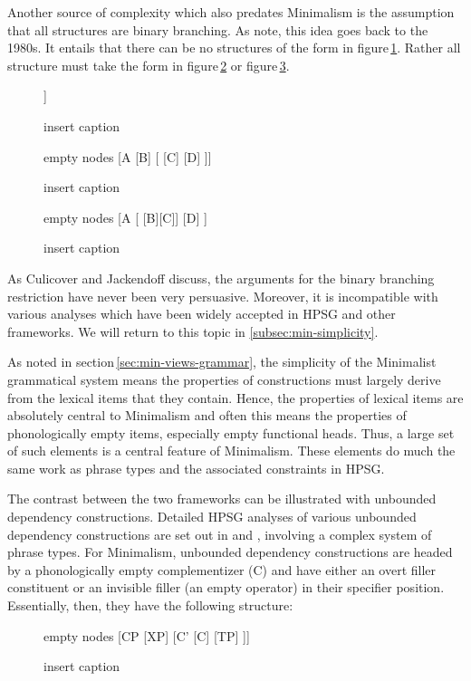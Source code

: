 \documentclass[output=paper]{langsci/langscibook}
\begin{document}
Another source of complexity which also predates Minimalism is the assumption that all structures are binary branching. As  \citet[112--116]{CJ2005a} note, this idea goes back to the 1980s. It entails that there can be no structures of the form in figure\,\ref{fig:min-trinary}. Rather all structure must take the form in figure\,\ref{fig:min-binary-a} or figure\,\ref{fig:min-binary-b}.
\begin{figure}[h!]
	\centering
	\begin{forest} %
		[A
		[B][C][D]
		]
	\end{forest}
	\caption{\label{fig:min-trinary}insert caption}
\end{figure}
\begin{figure}[h!]
	\centering
	\begin{forest} %
		empty nodes
		[A
		[B]
		[{} [C] [D]
		]]
	\end{forest}
	\caption{\label{fig:min-binary-a}insert caption}
\end{figure}
\begin{figure}[h!]
	\centering
	\begin{forest} %
		empty nodes
		[A
		[{} [B][C]]
		[D]
		]
	\end{forest}
	\caption{\label{fig:min-binary-b}insert caption}
\end{figure}

\noindent As Culicover and Jackendoff discuss, the arguments for the binary branching restriction have never been very persuasive. Moreover, it is incompatible with various analyses which have been widely accepted in HPSG and other frameworks. We will return to this topic in \ref{subsec:min-simplicity}.

As noted in section\,\ref{sec:min-views-grammar}, the simplicity of the Minimalist grammatical system means the properties of constructions must largely derive from the lexical items that they contain. Hence, the properties of lexical items are absolutely central to Minimalism and often this means the properties of phonologically empty items, especially empty functional heads. Thus, a large set of such elements is a central feature of Minimalism. These elements do much the same work as phrase types and the associated constraints in HPSG.

The contrast between the two frameworks can be illustrated with unbounded dependency constructions. Detailed HPSG analyses of various unbounded dependency constructions are set out in \citet{Sag97a,Sag2010b} and \citet{GSag2000a-u}, involving a complex system of phrase types. For Minimalism, unbounded dependency constructions are headed by a phonologically empty complementizer (C) and have either an overt filler constituent or an invisible filler (an empty operator) in their specifier position. Essentially, then, they have the following structure:
\begin{figure}[h!]
	\centering
	\begin{forest} %
		empty nodes
		[CP
		[XP]
		[C' [C] [TP]
		]]
	\end{forest}
	\caption{\label{fig:min-CP}insert caption}
\end{figure}
\end{document}
